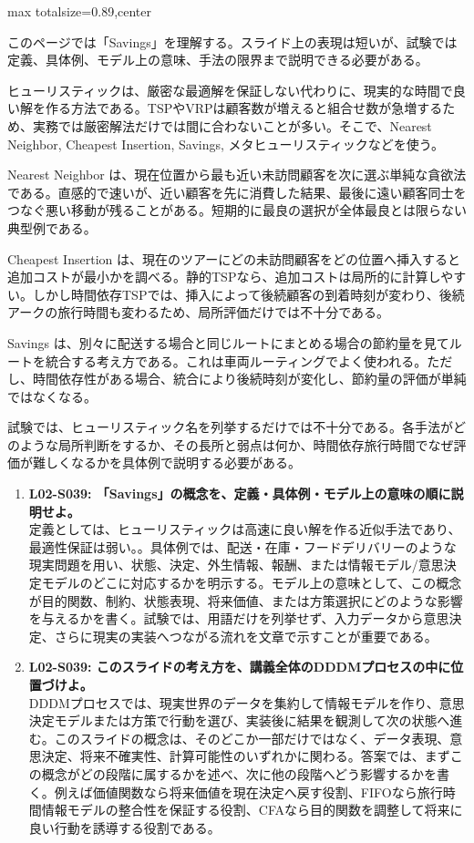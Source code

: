 \begin{minipage}[t]{0.58\textwidth}
\begin{adjustbox}{max totalsize={\textwidth}{0.89\textheight},center}
\begin{minipage}{\textwidth}\scriptsize
{}このページでは「Savings」を理解する。スライド上の表現は短いが、試験では定義、具体例、モデル上の意味、手法の限界まで説明できる必要がある。\par
ヒューリスティックは、厳密な最適解を保証しない代わりに、現実的な時間で良い解を作る方法である。TSPやVRPは顧客数が増えると組合せ数が急増するため、実務では厳密解法だけでは間に合わないことが多い。そこで、Nearest Neighbor, Cheapest Insertion, Savings, メタヒューリスティックなどを使う。\par
Nearest Neighbor は、現在位置から最も近い未訪問顧客を次に選ぶ単純な貪欲法である。直感的で速いが、近い顧客を先に消費した結果、最後に遠い顧客同士をつなぐ悪い移動が残ることがある。短期的に最良の選択が全体最良とは限らない典型例である。\par
Cheapest Insertion は、現在のツアーにどの未訪問顧客をどの位置へ挿入すると追加コストが最小かを調べる。静的TSPなら、追加コストは局所的に計算しやすい。しかし時間依存TSPでは、挿入によって後続顧客の到着時刻が変わり、後続アークの旅行時間も変わるため、局所評価だけでは不十分である。\par
Savings は、別々に配送する場合と同じルートにまとめる場合の節約量を見てルートを統合する考え方である。これは車両ルーティングでよく使われる。ただし、時間依存性がある場合、統合により後続時刻が変化し、節約量の評価が単純ではなくなる。\par
試験では、ヒューリスティック名を列挙するだけでは不十分である。各手法がどのような局所判断をするか、その長所と弱点は何か、時間依存旅行時間でなぜ評価が難しくなるかを具体例で説明する必要がある。\par{}\begin{enumerate}\item \textbf{L02-S039: 「Savings」の概念を、定義・具体例・モデル上の意味の順に説明せよ。}\\定義としては、ヒューリスティックは高速に良い解を作る近似手法であり、最適性保証は弱い。。具体例では、配送・在庫・フードデリバリーのような現実問題を用い、状態、決定、外生情報、報酬、または情報モデル/意思決定モデルのどこに対応するかを明示する。モデル上の意味として、この概念が目的関数、制約、状態表現、将来価値、または方策選択にどのような影響を与えるかを書く。試験では、用語だけを列挙せず、入力データから意思決定、さらに現実の実装へつながる流れを文章で示すことが重要である。\item \textbf{L02-S039: このスライドの考え方を、講義全体のDDDMプロセスの中に位置づけよ。}\\DDDMプロセスでは、現実世界のデータを集約して情報モデルを作り、意思決定モデルまたは方策で行動を選び、実装後に結果を観測して次の状態へ進む。このスライドの概念は、そのどこか一部だけではなく、データ表現、意思決定、将来不確実性、計算可能性のいずれかに関わる。答案では、まずこの概念がどの段階に属するかを述べ、次に他の段階へどう影響するかを書く。例えば価値関数なら将来価値を現在決定へ戻す役割、FIFOなら旅行時間情報モデルの整合性を保証する役割、CFAなら目的関数を調整して将来に良い行動を誘導する役割である。\end{enumerate}

\end{minipage}
\end{adjustbox}
\end{minipage}
